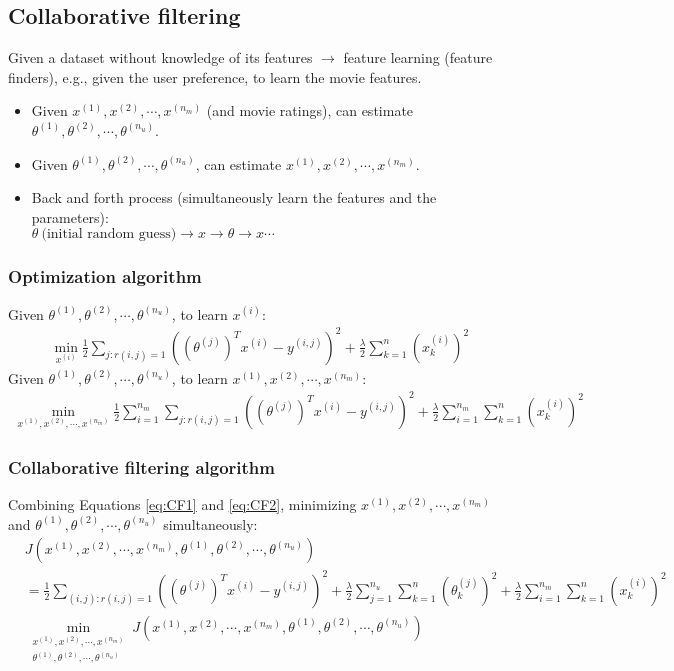 %
\subsection{Collaborative filtering}
Given a dataset without knowledge of its features $\rightarrow$ feature learning (feature finders), e.g., given the user preference, to learn the movie features.
\begin{itemize}
\item[]
Given $x^{(1)}, x^{(2)}, \cdots, x^{(n_m)}$ (and movie ratings), can estimate $\theta^{(1)}, \theta^{(2)}, \cdots, \theta^{(n_u)}$.
\item[]
Given $\theta^{(1)}, \theta^{(2)}, \cdots, \theta^{(n_u)}$, can estimate $x^{(1)}, x^{(2)}, \cdots, x^{(n_m)}$.
\item[]
Back and forth process (simultaneously learn the features and the parameters):\\
$\theta ~\text{(initial random guess)} \rightarrow x \rightarrow \theta \rightarrow x \cdots$
\end{itemize}

\subsubsection{Optimization algorithm}
Given $\theta^{(1)}, \theta^{(2)}, \cdots, \theta^{(n_u)}$, to learn $x^{(i)}$:
\begin{align*}
\min_{x^{(i)}}\frac{1}{2}\sum_{j : r(i,j)=1}((\theta^{(j)})^Tx^{(i)} - y^{(i,j)})^2 + \frac{\lambda}{2}\sum_{k=1}^n(x_k^{(i)})^2
\end{align*}
Given $\theta^{(1)}, \theta^{(2)}, \cdots, \theta^{(n_u)}$, to learn $x^{(1)}, x^{(2)}, \cdots, x^{(n_m)}$:
\begin{align}
\min_{x^{(1)}, x^{(2)}, \cdots, x^{(n_m)}}\frac{1}{2}\sum_{i=1}^{n_m}\sum_{j : r(i,j)=1}((\theta^{(j)})^Tx^{(i)} - y^{(i,j)})^2 + \frac{\lambda}{2}\sum_{i=1}^{n_m}\sum_{k=1}^n(x_k^{(i)})^2  \label{eq:CF2}
\end{align}

\subsubsection{Collaborative filtering algorithm}
Combining Equations \ref{eq:CF1} and \ref{eq:CF2}, minimizing $x^{(1)}, x^{(2)}, \cdots, x^{(n_m)}$ and $\theta^{(1)}, \theta^{(2)}, \cdots, \theta^{(n_u)}$ simultaneously:
\begin{align}
&J(x^{(1)}, x^{(2)}, \cdots, x^{(n_m)}, \theta^{(1)}, \theta^{(2)}, \cdots, \theta^{(n_u)}) \nonumber\\
&= \frac{1}{2}\sum_{(i,j):r(i,j)=1}((\theta^{(j)})^Tx^{(i)} - y^{(i,j)})^2 + \frac{\lambda}{2}\sum_{j=1}^{n_u}\sum_{k=1}^n(\theta_k^{(j)})^2 + \frac{\lambda}{2}\sum_{i=1}^{n_m}\sum_{k=1}^n(x_k^{(i)})^2\\
&\min_{\substack{x^{(1)}, x^{(2)}, \cdots, x^{(n_m)}\\ \theta^{(1)}, \theta^{(2)}, \cdots, \theta^{(n_u)}}}J(x^{(1)}, x^{(2)}, \cdots, x^{(n_m)}, \theta^{(1)}, \theta^{(2)}, \cdots, \theta^{(n_u)})
\end{align}

